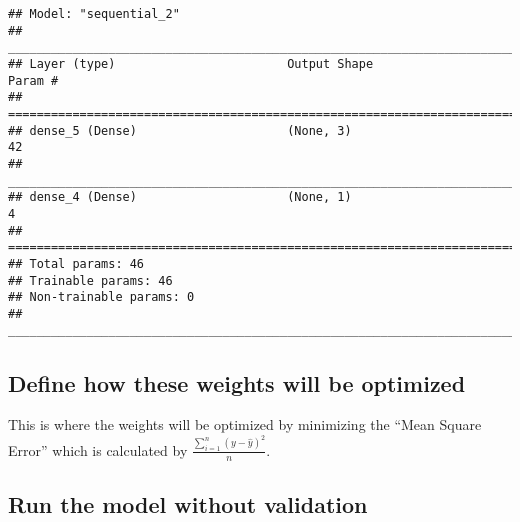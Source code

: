 \documentclass[
]{book}
\newenvironment{Shaded}{\begin{snugshade}}{\end{snugshade}}
\newcommand{\DataTypeTok}[1]{\textcolor[rgb]{0.13,0.29,0.53}{#1}}
\newcommand{\DecValTok}[1]{\textcolor[rgb]{0.00,0.00,0.81}{#1}}
\newcommand{\FloatTok}[1]{\textcolor[rgb]{0.00,0.00,0.81}{#1}}
\newcommand{\KeywordTok}[1]{\textcolor[rgb]{0.13,0.29,0.53}{\textbf{#1}}}
\newcommand{\NormalTok}[1]{#1}
\newcommand{\OperatorTok}[1]{\textcolor[rgb]{0.81,0.36,0.00}{\textbf{#1}}}
\newcommand{\StringTok}[1]{\textcolor[rgb]{0.31,0.60,0.02}{#1}}
\begin{document}
\begin{verbatim}
## Model: "sequential_2"
## ________________________________________________________________________________
## Layer (type)                        Output Shape                    Param #     
## ================================================================================
## dense_5 (Dense)                     (None, 3)                       42          
## ________________________________________________________________________________
## dense_4 (Dense)                     (None, 1)                       4           
## ================================================================================
## Total params: 46
## Trainable params: 46
## Non-trainable params: 0
## ________________________________________________________________________________
\end{verbatim}

\hypertarget{define-how-these-weights-will-be-optimized}{%
\subsection{Define how these weights will be optimized}\label{define-how-these-weights-will-be-optimized}}

This is where the weights will be optimized by minimizing the ``Mean Square Error'' which is calculated by \(\frac{\sum_{i=1}^{n}(y-\hat y)^2}{n}\).

\begin{Shaded}
\end{Shaded}

\hypertarget{run-the-model-without-validation}{%
\subsection{Run the model without validation}\label{run-the-model-without-validation}}

\begin{Shaded}
\end{Shaded}
\end{document}
